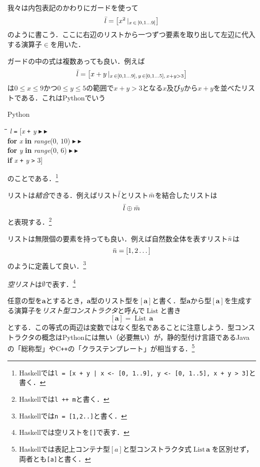 \documentclass[twocolumn]{jsbook}
\newcommand{\cxx}{\textrm{C}\texttt{++}}
\newcommand{\keyword}[1]{{\emph{#1}}}
\newcommand{\code}[1]{\texttt{#1}}
\newenvironment{pythoncode}{\begin{itembox}[r]{Python}}{\end{itembox}}
\newenvironment{python}{\begin{tabbing}\hspace*{1em}\=\hspace*{1em}\=\hspace*{1em}\=\hspace*{1em}\=\kill}{\end{tabbing}}
\newcommand{\pthnId}[1]{\textit{#1}}
\newcommand{\pthnKeyword}[1]{\textbf{#1}}
\newcommand{\pthnOp}[1]{\texttt{#1}}
\newcommand{\pthnNextLine}{$\blacktriangleright\blacktriangleright$}
\newcommand{\hsklType}[1]{\textbf{#1}}
\newcommand{\hsklTypeConstructor}[1]{\mathop{\mathrm{#1}}}
\DeclareMathOperator{\hsklListConstructor}{\hsklTypeConstructor{List}}
\newcommand{\hsklAppend}{\oplus}
\newcommand{\hsklEmptyList}{\emptyset}
\newcommand{\hsklList}[1]{\Bar{#1}}
\newcommand{\hsklListType}[1]{[#1]}
\newcommand{\hsklTypeConstruct}[2]{#1\,#2}
\DeclareMathOperator{\mathFrom}{\in}
\newcommand{\mathGuard}[1]{\mathop{\mid_{#1}}}
\begin{document}
我々は内包表記のかわりにガードを使って$$\hsklList{l}=\left[x^2\mathGuard{x\mathFrom{[0,1\dots9]}}\right]$$のように書こう．ここに右辺のリストから一つずつ要素を取り出して左辺に代入する演算子$\mathFrom$を用いた．

ガードの中の式は複数あっても良い．例えば$$\hsklList{l}=\left[x+y\mathGuard{x\mathFrom[0,1\dots9],\,y\mathFrom[0,1\dots5],\,x+y>3}\right]$$は$0\le x\le9$かつ$0\le y\le5$の範囲で$x+y>3$となる$x$及び$y$から$x+y$を並べたリストである．これはPythonでいう
\begin{pythoncode}
\begin{python}
\pthnId{l} \pthnOp{=} [\pthnId{x} \pthnOp{+} \pthnId{y} \pthnNextLine\\
\>\pthnKeyword{for} \pthnId{x} \pthnKeyword{in} \pthnId{range}($0$, $10$) \pthnNextLine\\
\>\pthnKeyword{for} \pthnId{y} \pthnKeyword{in} \pthnId{range}($0$, $6$) \pthnNextLine\\
\>\pthnKeyword{if} \pthnId{x} \pthnOp{+} \pthnId{y} \pthnOp{>} $3$]
\end{python}
\end{pythoncode}
のことである．\footnote{Haskellでは\code{l = [x + y | x <- [0, 1..9], y <- [0, 1..5], x + y > 3]}と書く．}

リストは\keyword{結合}できる．例えばリスト$\hsklList{l}$とリスト$\hsklList{m}$を結合したリストは$$\hsklList{l}\hsklAppend\hsklList{m}$$と表現する．\footnote{Haskellでは\code{l ++ m}と書く．}

リストは無限個の要素を持っても良い．例えば自然数全体を表すリスト$\hsklList{n}$は$$\hsklList{n}=[1,2\dots]$$のように定義して良い．\footnote{Haskellでは\code{n = [1,2..]}と書く．}

\keyword{空リスト}は$\hsklEmptyList$で表す．\footnote{Haskellでは空リストを\code{[]}で表す．}

任意の型を$\hsklType{a}$とするとき，$\hsklType{a}$型のリスト型を$\hsklListType{\hsklType{a}}$と書く．型$\hsklType{a}$から型$\hsklListType{\hsklType{a}}$を生成する演算子を\keyword{リスト型コンストラクタ}と呼んで$\hsklListConstructor$と書き$$\hsklListType{\hsklType{a}}=\hsklTypeConstruct{\hsklListConstructor}{\hsklType{a}}$$とする．この等式の両辺は変数ではなく型名であることに注意しよう．型コンストラクタの概念はPythonには無い（必要無い）が，静的型付け言語であるJavaの「総称型」や\cxx の「クラステンプレート」が相当する．\footnote{Haskellでは表記上コンテナ型$\hsklListType{a}$と型コンストラクタ式$\hsklTypeConstruct{\hsklListConstructor}{\hsklType{a}}$を区別せず，両者とも\code{[a]}と書く．}
\end{document}
